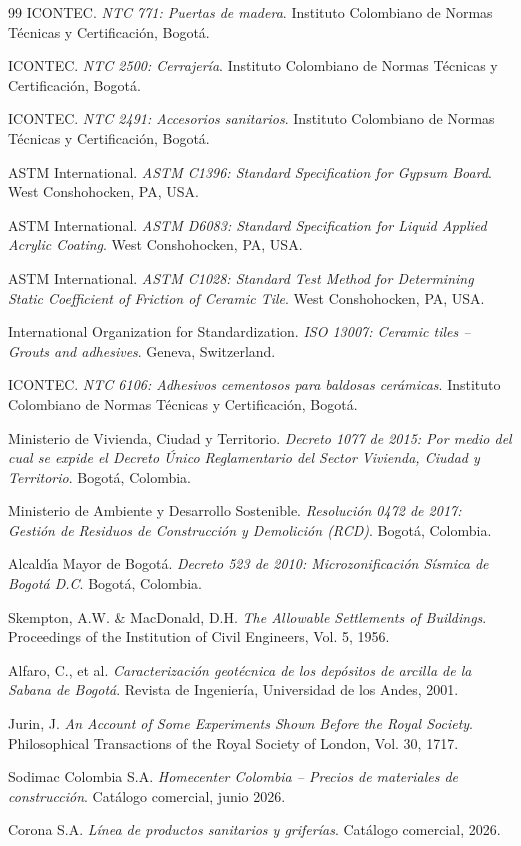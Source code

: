 ﻿\documentclass[12pt]{article}
\begin{document}
\begin{thebibliography}{99}
 ICONTEC. \textit{NTC 771: Puertas de madera}. Instituto Colombiano de Normas Técnicas y Certificación, Bogot\'a.

 ICONTEC. \textit{NTC 2500: Cerrajería}. Instituto Colombiano de Normas Técnicas y Certificación, Bogot\'a.

 ICONTEC. \textit{NTC 2491: Accesorios sanitarios}. Instituto Colombiano de Normas Técnicas y Certificación, Bogot\'a.

 ASTM International. \textit{ASTM C1396: Standard Specification for Gypsum Board}. West Conshohocken, PA, USA.

 ASTM International. \textit{ASTM D6083: Standard Specification for Liquid Applied Acrylic Coating}. West Conshohocken, PA, USA.

 ASTM International. \textit{ASTM C1028: Standard Test Method for Determining Static Coefficient of Friction of Ceramic Tile}. West Conshohocken, PA, USA.

 International Organization for Standardization. \textit{ISO 13007: Ceramic tiles -- Grouts and adhesives}. Geneva, Switzerland.

 ICONTEC. \textit{NTC 6106: Adhesivos cementosos para baldosas cerámicas}. Instituto Colombiano de Normas Técnicas y Certificación, Bogot\'a.

 Ministerio de Vivienda, Ciudad y Territorio. \textit{Decreto 1077 de 2015: Por medio del cual se expide el Decreto Único Reglamentario del Sector Vivienda, Ciudad y Territorio}. Bogot\'a, Colombia.

 Ministerio de Ambiente y Desarrollo Sostenible. \textit{Resolución 0472 de 2017: Gestión de Residuos de Construcción y Demolición (RCD)}. Bogot\'a, Colombia.

 Alcald\'{\i}a Mayor de Bogot\'a. \textit{Decreto 523 de 2010: Microzonificación Sísmica de Bogot\'a D.C}. Bogot\'a, Colombia.

 Skempton, A.W. \& MacDonald, D.H. \textit{The Allowable Settlements of Buildings}. Proceedings of the Institution of Civil Engineers, Vol. 5, 1956.

 Alfaro, C., et al. \textit{Caracterización geotécnica de los depósitos de arcilla de la Sabana de Bogotá}. Revista de Ingeniería, Universidad de los Andes, 2001.

 Jurin, J. \textit{An Account of Some Experiments Shown Before the Royal Society}. Philosophical Transactions of the Royal Society of London, Vol. 30, 1717.

 Sodimac Colombia S.A. \textit{Homecenter Colombia -- Precios de materiales de construcción}. Catálogo comercial, junio 2026.

 Corona S.A. \textit{Línea de productos sanitarios y griferías}. Catálogo comercial, 2026.

\end{thebibliography}
\end{document}
